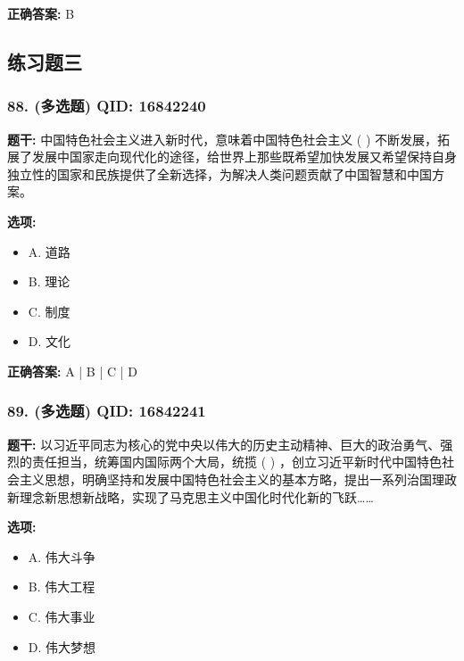 \documentclass[12pt,UTF8]{ctexart}
\begin{document}
\textbf{正确答案:}
B

\vspace{0.3em}\hrulefill\vspace{0.7em}

\subsection*{练习题三}

\subsubsection*{88. (多选题) \small QID: 16842240}

\textbf{题干:}
中国特色社会主义进入新时代，意味着中国特色社会主义 ( ) 不断发展，拓展了发展中国家走向现代化的途径，给世界上那些既希望加快发展又希望保持自身独立性的国家和民族提供了全新选择，为解决人类问题贡献了中国智慧和中国方案。

\textbf{选项:}
\begin{itemize}[leftmargin=*]

  \item A. 道路

  \item B. 理论

  \item C. 制度

  \item D. 文化

\end{itemize}

\textbf{正确答案:}
A | B | C | D

\vspace{0.3em}\hrulefill\vspace{0.7em}

\subsubsection*{89. (多选题) \small QID: 16842241}

\textbf{题干:}
以习近平同志为核心的党中央以伟大的历史主动精神、巨大的政治勇气、强烈的责任担当，统筹国内国际两个大局，统揽 ( ) ，创立习近平新时代中国特色社会主义思想，明确坚持和发展中国特色社会主义的基本方略，提出一系列治国理政新理念新思想新战略，实现了马克思主义中国化时代化新的飞跃……

\textbf{选项:}
\begin{itemize}[leftmargin=*]

  \item A. 伟大斗争

  \item B. 伟大工程

  \item C. 伟大事业

  \item D. 伟大梦想

\end{itemize}
\end{document}
